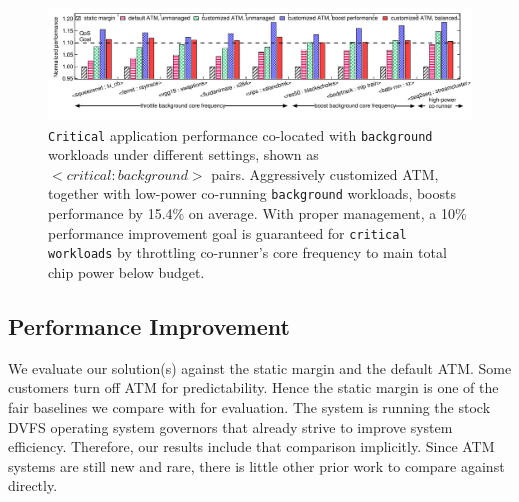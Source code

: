 \begin{figure}[t]
  \centering
  \includegraphics[trim=10 30 0 0,clip,width=\linewidth]{graphs/process//schedule-1t.pdf}
  \caption{\texttt{Critical} application performance co-located with \texttt{background} workloads under different settings, shown as $<\!critical:background\!>$ pairs. Aggressively customized ATM, together with low-power co-running \texttt{background} workloads, boosts performance by 15.4\% on average. With proper management, a 10\% performance improvement goal is guaranteed for \texttt{critical workloads} by throttling co-runner's core frequency to main total chip power below budget.}
  \label{fig:schedule-1t-results}
  \vspace*{-0.3cm}
\end{figure}

\subsection{Performance Improvement}
\label{sec:process:schedule:result}


We evaluate our solution(s) against the static margin and the default ATM. Some customers turn off ATM for predictability. Hence the static margin is one of the fair baselines we compare with for evaluation. The system is running the stock DVFS operating system governors that already strive to improve system efficiency. Therefore, our results include that comparison implicitly. Since ATM systems are still new and rare, there is little other prior work to compare against directly.

